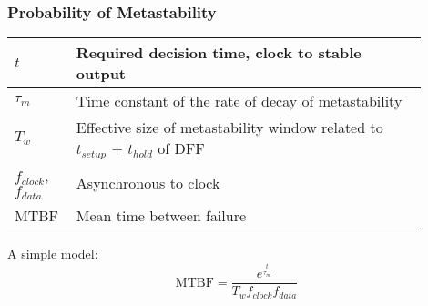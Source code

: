         \subsubsection{Probability of Metastability}
        \begin{tabular}{| p{0.11\linewidth} | p{0.79\linewidth} |}
            \hline
            $t$ & Required decision time, clock to stable output \\
            \hline
            $\tau_m$ & Time constant of the rate of decay of metastability \\
            \hline
            $T_w$ & Effective size of metastability window related to $t_{setup}$ + $t_{hold}$ of DFF \\
            \hline
            $f_{clock}$, $f_{data}$ & Asynchronous to clock \\
            \hline
            MTBF & Mean time between failure\\
            \hline
        \end{tabular}

        A simple model:
        $$\text{MTBF} = \frac{e^{\frac{t}{\tau_m}}}{T_w f_{clock} f_{data}}$$